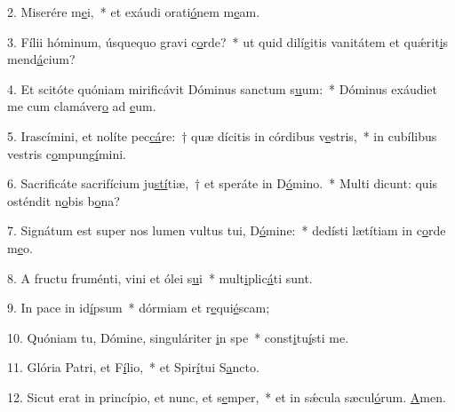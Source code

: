 2. Miserére m\uline{e}i,~* et exáudi orati\uline{ó}nem m\uline{e}am.\par 
3. Fílii hóminum, úsquequo gravi c\uline{o}rde?~* ut quid dilígitis vanitátem et quǽrit\uline{i}s mend\uline{á}cium?\par 
4. Et scitóte quóniam mirificávit Dóminus sanctum s\uline{u}um:~* Dóminus exáudiet me cum clamáver\uline{o} ad \uline{e}um.\par 
5. Irascímini, et nolíte pec\uline{cá}re:~† quæ dícitis in córdibus v\uline{e}stris,~* in cubílibus vestris c\uline{o}mpung\uline{í}mini.\par 
6. Sacrificáte sacrifícium ju\uline{stí}tiæ,~† et speráte in D\uline{ó}mino.~* Multi dicunt: quis osténdit n\uline{o}bis b\uline{o}na?\par 
7. Signátum est super nos lumen vultus tui, D\uline{ó}mine:~* dedísti lætítiam in c\uline{o}rde m\uline{e}o.\par 
8. A fructu fruménti, vini et ólei s\uline{u}i~* mult\uline{i}plic\uline{á}ti sunt.\par 
9. In pace in id\uline{í}psum~* dórmiam et r\uline{e}qui\uline{é}scam;\par 
10. Quóniam tu, Dómine, singuláriter \uline{i}n spe~* const\uline{i}tu\uline{í}sti me.\par 
11. Glória Patri, et F\uline{í}lio,~* et Spir\uline{í}tui S\uline{a}ncto.\par 
12. Sicut erat in princípio, et nunc, et s\uline{e}mper,~* et in sǽcula sæcul\uline{ó}rum. \uline{A}men.\par 
